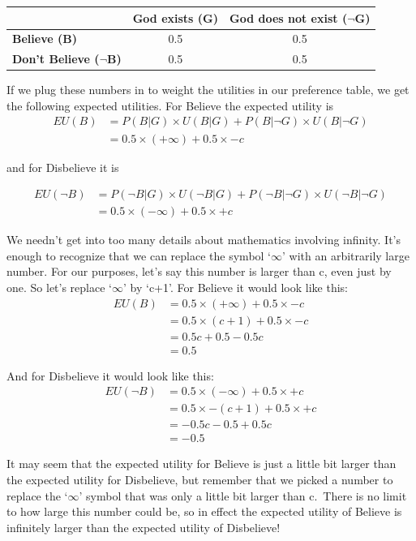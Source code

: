 \documentclass[]{tufte-book}
\begin{document}
\begin{longtable}[]{@{}lcc@{}}
\toprule
& God exists (G) & God does not exist (\(\neg\)G)\tabularnewline
\midrule
\endhead
\textbf{Believe (B)} & 0.5 & 0.5\tabularnewline
\textbf{Don't Believe (\(\neg\)B)} & 0.5 & 0.5\tabularnewline
\bottomrule
\end{longtable}

If we plug these numbers in to weight the utilities in our preference table, we get the following expected utilities. For Believe the expected utility is
\[
\begin{aligned}
EU(B)&=P(B|G)\times U(B|G) + P(B|\neg G) \times U(B|\neg G) \\
&= 0.5 \times (+\infty) + 0.5 \times -c
\end{aligned}
\]

and for Disbelieve it is

\[
\begin{aligned}
EU(\neg B)&=P(\neg B |G)\times U(\neg B|G) + P(\neg B | \neg G) \times U(\neg B|\neg G) \\
&= 0.5 \times (-\infty) + 0.5 \times +c
\end{aligned}
\]

We needn't get into too many details about mathematics involving infinity. It's enough to recognize that we can replace the symbol `\(\infty\)' with an arbitrarily large number. For our purposes, let's say this number is larger than c, even just by one. So let's replace `\(\infty\)' by `c+1'. For Believe it would look like this:
\[
\begin{aligned}
EU(B)&= 0.5 \times (+\infty) + 0.5 \times -c \\
&= 0.5 \times (c+1) + 0.5 \times -c \\
&= 0.5c + 0.5 - 0.5c \\
&= 0.5
\end{aligned}
\]

And for Disbelieve it would look like this:
\[
\begin{split}
EU(\neg B)&= 0.5 \times (-\infty) + 0.5 \times +c \\
&= 0.5 \times -(c+1) + 0.5 \times +c \\
&= -0.5c - 0.5 + 0.5c \\
&= -0.5
\end{split}
\]

It may seem that the expected utility for Believe is just a little bit larger than the expected utility for Disbelieve, but remember that we picked a number to replace the `\(\infty\)' symbol that was only a little bit larger than c.~There is no limit to how large this number could be, so in effect the expected utility of Believe is infinitely larger than the expected utility of Disbelieve!
\end{document}
